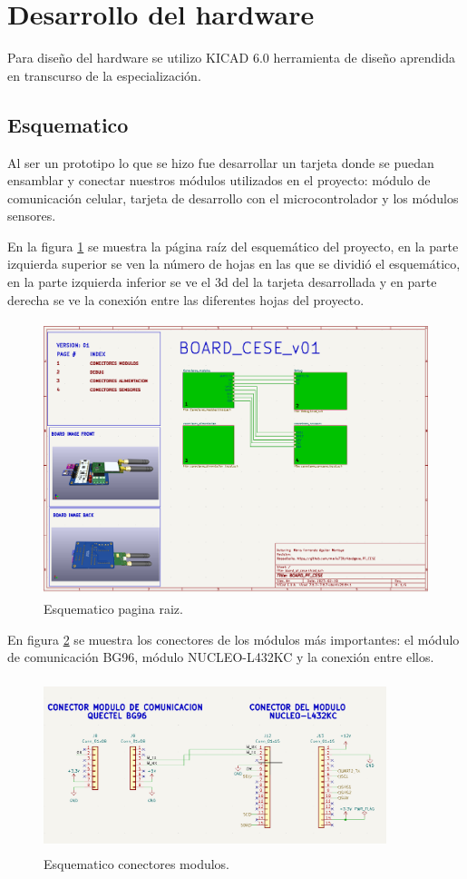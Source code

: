 \section{Desarrollo del hardware}

Para diseño del hardware se utilizo KICAD 6.0 herramienta de diseño aprendida en transcurso de  la especialización.

\subsection{Esquematico} 
Al ser un prototipo lo que se hizo fue desarrollar un tarjeta donde se puedan ensamblar y conectar nuestros módulos utilizados en el proyecto: módulo de comunicación celular, tarjeta de desarrollo con el microcontrolador y  los módulos sensores.

En la figura \ref{fig:esquematico root} se muestra la página raíz del esquemático del proyecto, en la parte izquierda superior se  ven la número de hojas en las que se dividió el esquemático, en la parte izquierda inferior se ve el 3d del la tarjeta desarrollada y en parte derecha se ve la conexión entre las diferentes hojas del proyecto.

\begin{figure}[h]
  \centering
	\includegraphics[width=\textwidth, height=8cm]{./Figures/esquematico_root.png}
	\caption{Esquematico pagina raiz.}
	\label{fig:esquematico root}
\end{figure}

En figura \ref{fig:esquematico modulos} se muestra los conectores de los módulos más importantes: el módulo de comunicación BG96, módulo NUCLEO-L432KC y la conexión entre ellos.

\begin{figure}[h]
  \centering
	\includegraphics[width=10cm, height=5cm]{./Figures/esquematico_modulos.png}
	\caption{Esquematico conectores modulos.}
	\label{fig:esquematico modulos}
\end{figure}

